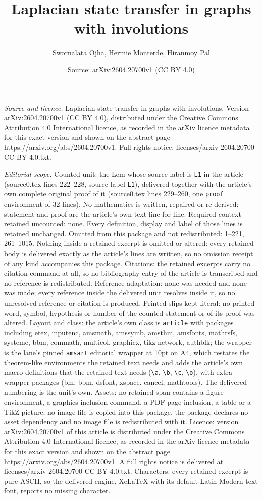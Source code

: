 \documentclass[10pt,a4paper]{amsart}
\title[Laplacian state transfer in graphs with involutions]{Laplacian state transfer in graphs with involutions}
\author{Swornalata Ojha, Hermie Monterde, Hiranmoy Pal}
\date{Source: arXiv:2604.20700v1 (CC BY 4.0)}
\begin{document}
\maketitle

\noindent\emph{Source and licence.} Laplacian state transfer in graphs with involutions. Version arXiv:2604.20700v1 (CC BY 4.0), distributed under the Creative Commons Attribution 4.0 International licence, as recorded in the arXiv licence metadata for this exact version and shown on the abstract page https://arxiv.org/abs/2604.20700v1. Full rights notice: licenses/arxiv-2604.20700-CC-BY-4.0.txt.\par\smallskip

\noindent\textit{Editorial scope.} Counted unit: the Lem whose source label is \texttt{L1} in the article (source0.tex lines 222--228, source label \texttt{L1}), delivered together with the article's own complete original proof of it (source0.tex lines 229--260, one \texttt{proof} environment of 32 lines). No mathematics is written, repaired or re-derived: statement and proof are the article's own text line for line. Required context retained uncounted: none. Every definition, display and label of those lines is retained unchanged. Omitted from this package and not redistributed: 1--221, 261--1015. Nothing inside a retained excerpt is omitted or altered: every retained body is delivered exactly as the article's lines are written, so no omission receipt of any kind accompanies this package. Citations: the retained excerpts carry no citation command at all, so no bibliography entry of the article is transcribed and no reference is redistributed. Reference adaptation: none was needed and none was made; every reference inside the delivered unit resolves inside it, so no unresolved reference or citation is produced. Printed slips kept literal: no printed word, symbol, hypothesis or number of the counted statement or of its proof was altered. Layout and class: the article's own class is \texttt{article} with packages including etex, inputenc, amsmath, amssymb, amsthm, amsfonts, mathrsfs, systeme, bbm, commath, multicol, graphicx, tikz-network, authblk; the wrapper is the lane's pinned \texttt{amsart} editorial wrapper at 10pt on A4, which restates the theorem-like environments the retained text needs and adds the article's own macro definitions that the retained text needs (\texttt{\textbackslash a}, \texttt{\textbackslash b}, \texttt{\textbackslash c}, \texttt{\textbackslash o}), with extra wrapper packages (bm, bbm, dsfont, xspace, cancel, mathtools). The delivered numbering is the unit's own. Assets: no retained span contains a figure environment, a graphics-inclusion command, a PDF-page inclusion, a table or a TikZ picture; no image file is copied into this package, the package declares no asset dependency and no image file is redistributed with it. Licence: version arXiv:2604.20700v1 of this article is distributed under the Creative Commons Attribution 4.0 International licence, as recorded in the arXiv licence metadata for this exact version and shown on the abstract page https://arxiv.org/abs/2604.20700v1. A full rights notice is delivered at licenses/arxiv-2604.20700-CC-BY-4.0.txt. Characters: every retained excerpt is pure ASCII, so the delivered engine, XeLaTeX with its default Latin Modern text font, reports no missing character.
\end{document}
